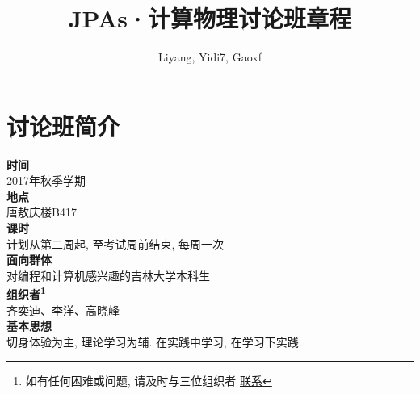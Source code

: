 \documentclass[10pt, a4paper, twocolumn]{article}
\title{\textbf{JPAs·计算物理讨论班章程}}
\author{Liyang, Yidi7, Gaoxf}
\begin{document}
  \maketitle

  \section{讨论班简介}
   \textbf{时间}\\2017年秋季学期\\
   \textbf{地点}\\唐敖庆楼B417\\
   \textbf{课时}\\计划从第二周起, 至考试周前结束, 每周一次\\
   \textbf{面向群体}\\对编程和计算机感兴趣的吉林大学本科生\\
   \textbf{组织者\footnote{如有任何困难或问题, 请及时与三位组织者
          \href{https://github.com/JLUComPhy/JLU_Computational_Physics/%
              blob/master/Organizer_info.md}{联系}}}\\齐奕迪、李洋、高晓峰\\
   \textbf{基本思想}\\切身体验为主, 理论学习为辅. 在实践中学习, 在学习下实践.
\end{document}

